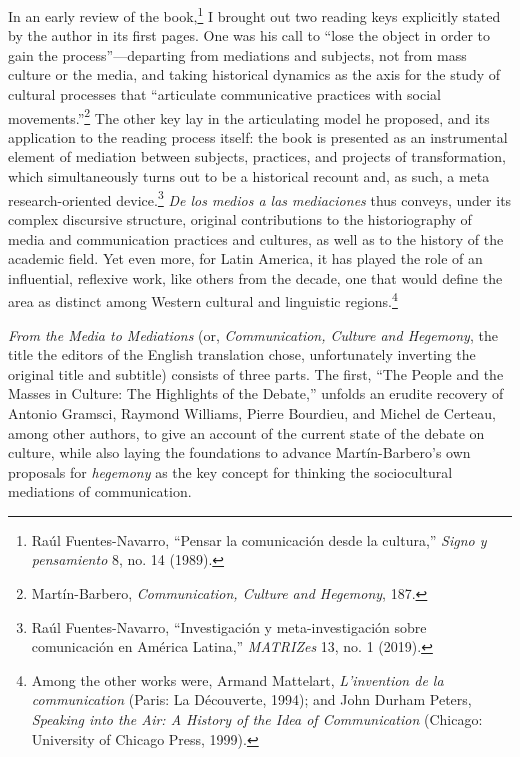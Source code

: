 \documentclass{tufte-handout}
\begin{document}
In an early review of the book,\footnote{Raúl Fuentes-Navarro, ``Pensar la comunicación desde la cultura,''
  \emph{Signo y pensamiento} 8, no. 14 (1989).
} I
brought out two reading keys explicitly stated by the author in its
first pages. One was his call to ``lose the object in order to gain the
process''---departing from mediations and subjects, not from mass
culture or the media, and taking historical dynamics as the axis for the
study of cultural processes that ``articulate communicative practices
with social movements.''\footnote{Martín-Barbero, \emph{Communication, Culture and Hegemony}, 187.
} The
other key lay in the articulating model he proposed, and its application
to the reading process itself: the book is presented as an instrumental
element of mediation between subjects, practices, and projects of
transformation, which simultaneously turns out to be a historical
recount and, as such, a meta research-oriented
device.\footnote{Raúl Fuentes-Navarro, ``Investigación y meta-investigación sobre
  comunicación en América Latina,'' \emph{MATRIZes} 13, no. 1 (2019).
} \emph{De los medios a las
mediaciones} thus conveys, under its complex discursive structure,
original contributions to the historiography of media and communication
practices and cultures, as well as to the history of the academic field.
Yet even more, for Latin America, it has played the role of an
influential, reflexive work, like others from the decade, one that would
define the area as distinct among Western cultural and linguistic
regions.\footnote{Among the other works were, Armand Mattelart, \emph{L'invention de la
  communication} (Paris: La Découverte, 1994); and John Durham Peters,
  \emph{Speaking into the Air: A History of the Idea of Communication}
  (Chicago: University of Chicago Press, 1999).
}

\emph{From the Media to Mediations} (or, \emph{Communication, Culture
and Hegemony}, the title the editors of the English translation chose,
unfortunately inverting the original title and subtitle) consists of
three parts. The first, ``The People and the Masses in Culture: The
Highlights of the Debate,'' unfolds an erudite recovery of Antonio
Gramsci, Raymond Williams, Pierre Bourdieu, and Michel de Certeau, among
other authors, to give an account of the current state of the debate on
culture, while also laying the foundations to advance Martín-Barbero's
own proposals for \emph{hegemony} as the key concept for thinking the
sociocultural mediations of communication.
\end{document}
